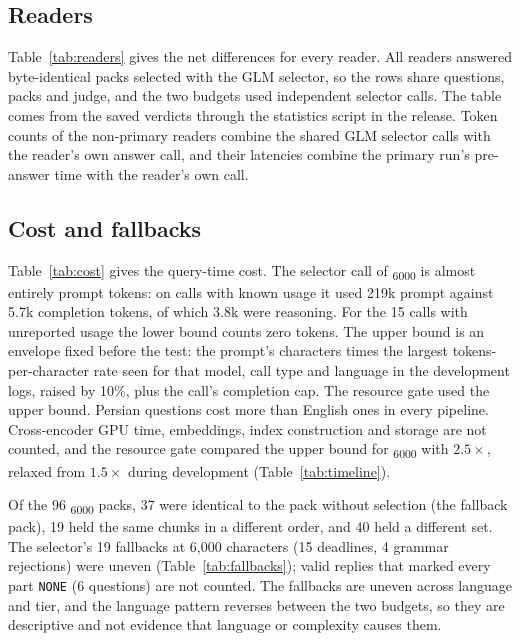 \subsection{Readers}\label{app:readers}
Table~\ref{tab:readers} gives the net differences for every reader. All readers answered byte-identical packs selected with the GLM selector, so the rows share questions, packs and judge, and the two \lexb{} budgets used independent selector calls. The table comes from the saved verdicts through the statistics script in the release. Token counts of the non-primary readers combine the shared GLM selector calls with the reader's own answer call, and their latencies combine the primary run's pre-answer time with the reader's own call.


\subsection{Cost and fallbacks}
Table~\ref{tab:cost} gives the query-time cost. The selector call of \lexb\textsubscript{6000} is almost entirely prompt tokens: on calls with known usage it used 219k prompt against 5.7k completion tokens, of which 3.8k were reasoning. For the 15 calls with unreported usage the lower bound counts zero tokens. The upper bound is an envelope fixed before the test: the prompt's characters times the largest tokens-per-character rate seen for that model, call type and language in the development logs, raised by 10\%, plus the call's completion cap. The resource gate used the upper bound. Persian questions cost more than English ones in every pipeline. Cross-encoder GPU time, embeddings, index construction and storage are not counted, and the resource gate compared the upper bound for \lexb\textsubscript{6000} with $2.5\times$, relaxed from $1.5\times$ during development (Table~\ref{tab:timeline}).



Of the 96 \lexb\textsubscript{6000} packs, 37 were identical to the pack without selection (the fallback pack), 19 held the same chunks in a different order, and 40 held a different set.
The selector's 19 fallbacks at 6,000 characters (15 deadlines, 4 grammar rejections) were uneven (Table~\ref{tab:fallbacks}); valid replies that marked every part \texttt{NONE} (6 questions) are not counted. The fallbacks are uneven across language and tier, and the language pattern reverses between the two budgets, so they are descriptive and not evidence that language or complexity causes them.

